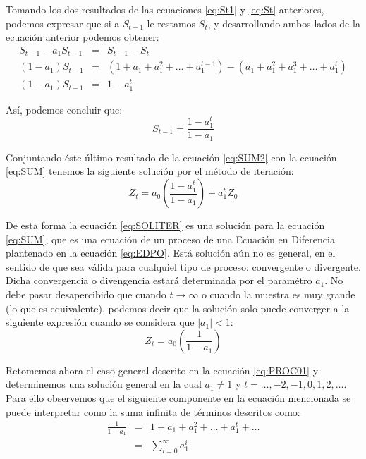 \documentclass[
]{book}
\begin{document}
Tomando los dos resultados de las ecuaciones \eqref{eq:St1} y \eqref{eq:St} anteriores, podemos expresar que si a \(S_{t-1}\) le restamos \(S_t\), y desarrollando ambos lados de la ecuación anterior podemos obtener:
\begin{eqnarray}
    S_{t-1} - a_1 S_{t-1} & = & S_{t-1} - S_{t} \nonumber \\
    (1 - a_1) S_{t-1} & = & (1 + a_1 + a^2_1 + \ldots + a^{t-1}_1) - (a_1 + a^2_1 + a^3_1 + \ldots + a^{t}_1) \nonumber \\
    (1 - a_1) S_{t-1} & = & 1 - a^{t}_1 \nonumber
\end{eqnarray}

Así, podemos concluir que:
\begin{equation}
    S_{t-1} = \frac{1 - a^{t}_1}{1 - a_1}
    \label{eq:SUM2}
\end{equation}

Conjuntando éste último resultado de la ecuación \eqref{eq:SUM2} con la ecuación \eqref{eq:SUM} tenemos la siguiente solución por el método de iteración:
\begin{equation}
    Z_t = a_0 \left( \frac{1 - a^{t}_1}{1 - a_1} \right) + a^t_1 Z_0
    \label{eq:SOLITER}
\end{equation}

De esta forma la ecuación \eqref{eq:SOLITER} es una solución para la ecuación \eqref{eq:SUM}, que es una ecuación de un proceso de una Ecuación en Diferencia plantenado en la ecuación \eqref{eq:EDPO}. Está solución aún no es general, en el sentido de que sea válida para cualquiel tipo de proceso: convergente o divergente. Dicha convergencia o divengencia estará determinada por el paramétro \(a_1\). No debe pasar desapercibido que cuando \(t \rightarrow \infty\) o cuando la muestra es muy grande (lo que es equivalente), podemos decir que la solución solo puede converger a la siguiente expresión cuando se considera que \(|a_1| < 1\):
\begin{equation}
    Z_t = a_0 \left( \frac{1}{1 - a_1} \right)
    \label{eq:trayec}
\end{equation}

Retomemos ahora el caso general descrito en la ecuación \eqref{eq:PROC01} y determinemos una solución general en la cual \(a_1 \neq 1\) y \(t = \ldots, -2, -1, 0, 1, 2, \ldots\). Para ello observemos que el siguiente componente en la ecuación mencionada se puede interpretar como la suma infinita de términos descritos como:
\begin{eqnarray}
    \frac{1}{1 - a_1} & = & 1 + a_1 + a_1^2 + \ldots + a_1^t + \ldots \nonumber \\
    & = & \sum_{i = 0}^{\infty} a_1^{i}
    \label{eq:SUMINF}
\end{eqnarray}
\end{document}
